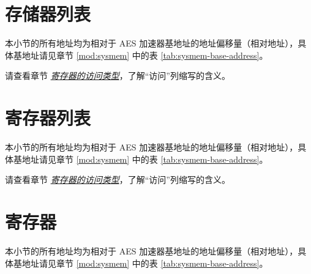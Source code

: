\documentclass[main\_\_CN.tex]{subfiles}
\begin{document}
\clearpage
\section{存储器列表}

本小节的所有地址均为相对于 AES 加速器基地址的地址偏移量（相对地址），具体基地址请见章节 \ref{mod:sysmem} \textit{} 中的表 \ref{tab:sysmem-base-address}。

请查看章节 \hyperref[glossary-access-types]{\textit{寄存器的访问类型}}，了解“访问”列缩写的含义。



\hypertarget{aes-reg-summ}{}
\section{寄存器列表}

本小节的所有地址均为相对于 AES 加速器基地址的地址偏移量（相对地址），具体基地址请见章节 \ref{mod:sysmem} \textit{} 中的表 \ref{tab:sysmem-base-address}。

请查看章节 \hyperref[glossary-access-types]{\textit{寄存器的访问类型}}，了解“访问”列缩写的含义。




\clearpage
\section{寄存器}

本小节的所有地址均为相对于 AES 加速器基地址的地址偏移量（相对地址），具体基地址请见章节 \ref{mod:sysmem} \textit{} 中的表 \ref{tab:sysmem-base-address}。


\end{document}
